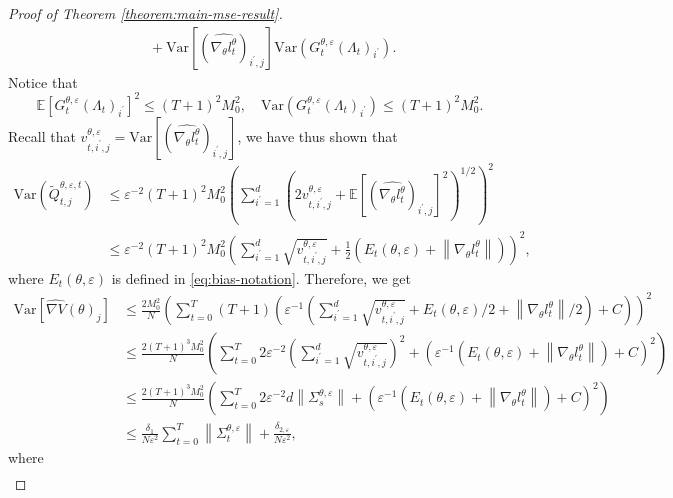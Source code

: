 \documentclass[11pt]{article}
\numberwithin{equation}{section}
\theoremstyle{definition}
\theoremstyle{remark}
\def\eps{\varepsilon}
\def\var{{\mathrm{Var}}}
\begin{document}
\begin{proof}[Proof of Theorem \ref{theorem:main-mse-result}]
\[\begin{aligned}
    & \quad + \var \left[ \left(\widehat{\nabla_\theta l_t^\theta}\right)_{i^\prime,j} \right] \var \left( G_t^{\theta, \eps}\left(\Lambda_t\right)_{i^\prime} \right). 
\end{aligned}
\]
Notice that
\[
\mathbb E \left[   G_t^{\theta, \eps}\left(\Lambda_t\right)_{i^\prime}\right]^2 \leq  (T + 1)^2 M_0^2,
\quad \var \left( G_t^{\theta, \eps}\left(\Lambda_t\right)_{i^\prime} \right) \leq (T + 1)^2 M_0^2.
\] 
Recall that $v^{\theta, \eps}_{t, i^\prime,j} = \var \left[ \left(\widehat{\nabla_\theta l_t^\theta}\right)_{i^\prime,j} \right]$, we have thus shown that
\[
\begin{aligned}
\var \left( \tilde Q_{t,j}^{\theta, \eps, t} \right) &\leq \eps^{-2} (T + 1)^2 M_0^2 \left(\sum_{i^\prime=1}^d \left(2 v^{\theta, \eps}_{t, i^\prime,j} + \mathbb E \left[ \left(\widehat{\nabla_\theta l_t^\theta} \right)_{i^\prime, j}\right]^2 \right)^{1/2} \right)^2 \\
& \leq \eps^{-2}  (T + 1)^2 M_0^2 \left( \sum_{i^\prime = 1}^{d} \sqrt{v^{\theta, \eps}_{t,i^\prime, j}}  + \frac{1}{2}\left(E_t(\theta, \eps) + \left\| \nabla_\theta l_t^\theta \right\| \right)\right)^2,
\end{aligned}
\]
where $E_t(\theta, \eps)$ is defined in \eqref{eq:bias-notation}.
Therefore, we get
\[
\begin{aligned}
   \var \left[\widehat{\nabla V}(\theta)_j\right] & \leq \frac{2 M_0^2}{N} \left( 
        \sum_{t=0}^{T} (T + 1) \left(\eps^{-1} \left( \sum_{i^\prime = 1}^{d} \sqrt{v^{\theta, \eps}_{t,i^\prime, j}} 
        + E_t(\theta, \eps) / 2 + \left\| \nabla_\theta l_t^\theta \right\| / 2 \right) + C \right)
        \right)^2 \\
        & \leq \frac{2 (T+1)^3 M_0^2}{N}  \left( 
        \sum_{t=0}^{T}  2 \eps^{-2} \left(\sum_{i^\prime = 1}^{d} \sqrt{v^{\theta, \eps}_{t,i^\prime, j}}\right)^2
        + \left(\eps^{-1}\left(E_t(\theta, \eps) + \left\| \nabla_\theta l_t^\theta \right\|\right) + C\right)^2 
        \right) \\ 
        &\leq \frac{2 (T+1)^3 M_0^2}{N}  \left( 
        \sum_{t=0}^{T}  2 \eps^{-2} d \left\| \Sigma_s^{\theta, \eps} \right\|
        +  \left(\eps^{-1}\left(E_t(\theta, \eps) + \left\| \nabla_\theta l_t^\theta \right\|\right) +  C\right)^2 
        \right) \\
        & \leq  \frac{\delta_1}{N \eps^2} \sum_{t=0}^{T}  \left\| \Sigma_t^{\theta, \eps} \right\| + \frac{\delta_{2, \eps}}{N \eps^2},
\end{aligned}
\]
where
\[
\begin{aligned}

\end{aligned}\]
\end{proof}
\end{document}
